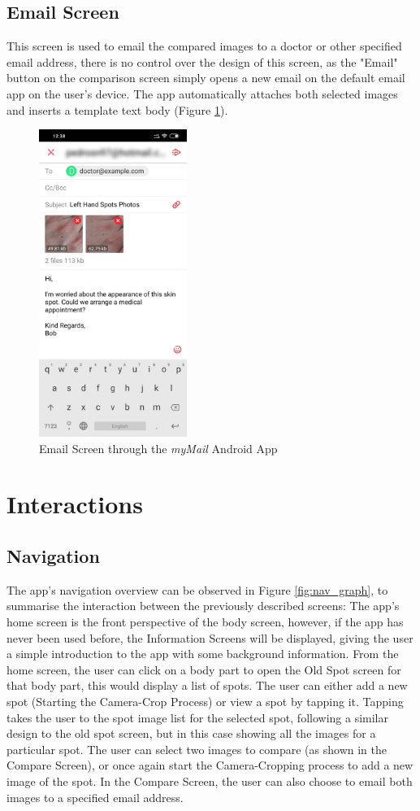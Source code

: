 \subsection{Email Screen}
This screen is used to email the compared images to a doctor or other specified email address, there is no control over the design of this screen, as the "Email" button on the comparison screen simply opens a new email on the default email app on the user's device. The app automatically attaches both selected images and inserts a template text body (Figure \ref{fig:emailscreen}). 

\begin{figure}
    \includegraphics[height=10cm, center]{figures/email_android.jpg}
    \caption{Email Screen through the \emph{myMail} Android App}
    \label{fig:emailscreen}
\end{figure}

\section{Interactions}
\subsection{Navigation}
The app's navigation overview can be observed in Figure \ref{fig:nav_graph}, to summarise the interaction between the previously described screens: The app's home screen is the front perspective of the body screen, however, if the app has never been used before, the Information Screens will be displayed, giving the user a simple introduction to the app with some background information. From the home screen, the user can click on a body part to open the Old Spot screen for that body part, this would display a list of spots. The user can either add a new spot (Starting the Camera-Crop Process) or view a spot by tapping it. Tapping takes the user to the spot image list for the selected spot, following a similar design to the old spot screen, but in this case showing all the images for a particular spot. The user can select two images to compare (as shown in the Compare Screen), or once again start the Camera-Cropping process to add a new image of the spot. In the Compare Screen, the user can also choose to email both images to a specified email address.

